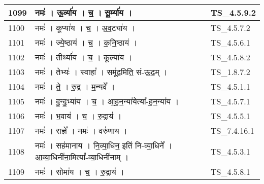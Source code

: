 \documentclass[17pt]{extarticle}
\begin{document}
\begin{longtable}{||p{0.4in}||p{4.9in}||p{0.9in}||}
    \hline
        
    1099 & नमः॑   ।   ऊ॒र्व्या॑य   ।   च॒   ।   सू॒र्म्या॑य   ।    & TS\_4.5.9.2       \\
    
    \hline
        
    1100 & नमः॑   ।   कूप्या॑य   ।   च॒   ।   अ॒व॒ट्या॑य   ।    & TS\_4.5.7.2       \\
    
    \hline
        
    1101 & नमः॑   ।   ज्ये॒ष्ठाय॑   ।   च॒   ।   क॒नि॒ष्ठाय॑   ।    & TS\_4.5.6.1       \\
    
    \hline
        
    1102 & नमः॑   ।   तीर्थ्या॑य   ।   च॒   ।   कूल्या॑य   ।    & TS\_4.5.8.2       \\
    
    \hline
        
    1103 & नमः॑   ।   तेभ्यः॑   ।   स्वाहा᳚   ।   समू॑ढ॒मिति॒ सं{-}ऊ॒ढ॒म्   ।    & TS\_1.8.7.2       \\
    
    \hline
        
    1104 & नमः॑   ।   ते॒   ।   रु॒द्र॒   ।   म॒न्यवे᳚   ।    & TS\_4.5.1.1       \\
    
    \hline
        
    1105 & नमः॑   ।   दु॒न्दु॒भ्या॑य   ।   च॒   ।   आ॒ह॒न॒न्या॑येत्या᳚{-}ह॒न॒न्या॑य   ।    & TS\_4.5.7.1       \\
    
    \hline
        
    1106 & नमः॑   ।   भ॒वाय॑   ।   च॒   ।   रु॒द्राय॑   ।    & TS\_4.5.5.1       \\
    
    \hline
        
    1107 & नमः॑   ।   राज्ञे᳚   ।   नमः॑   ।   वरु॑णाय   ।    & TS\_7.4.16.1       \\
    
    \hline
        
    1108 & नमः॑   ।   सह॑मानाय   ।   नि॒व्या॒धिन॒ इति॑ नि{-}व्या॒धिने᳚   ।   आ॒व्या॒धिनी॑ना॒मित्या᳚{-}व्या॒धिनी॑नाम्   ।    & TS\_4.5.3.1       \\
    
    \hline
        
    1109 & नमः॑   ।   सोमा॑य   ।   च॒   ।   रु॒द्राय॑   ।    & TS\_4.5.8.1       \\
    

\end{longtable}
\end{document}
